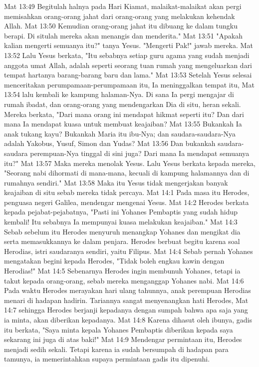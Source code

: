 Mat 13:49  Begitulah halnya pada Hari Kiamat, malaikat-malaikat akan pergi memisahkan orang-orang jahat dari orang-orang yang melakukan kehendak Allah.
Mat 13:50  Kemudian orang-orang jahat itu dibuang ke dalam tungku berapi. Di situlah mereka akan menangis dan menderita."
Mat 13:51  "Apakah kalian mengerti semuanya itu?" tanya Yesus. "Mengerti Pak!" jawab mereka.
Mat 13:52  Lalu Yesus berkata, "Itu sebabnya setiap guru agama yang sudah menjadi anggota umat Allah, adalah seperti seorang tuan rumah yang mengeluarkan dari tempat hartanya barang-barang baru dan lama."
Mat 13:53  Setelah Yesus selesai menceritakan perumpamaan-perumpamaan itu, Ia meninggalkan tempat itu,
Mat 13:54  lalu kembali ke kampung halaman-Nya. Di sana Ia pergi mengajar di rumah ibadat, dan orang-orang yang mendengarkan Dia di situ, heran sekali. Mereka berkata, "Dari mana orang ini mendapat hikmat seperti itu? Dan dari mana Ia mendapat kuasa untuk membuat keajaiban?
Mat 13:55  Bukankah Ia anak tukang kayu? Bukankah Maria itu ibu-Nya; dan saudara-saudara-Nya adalah Yakobus, Yusuf, Simon dan Yudas?
Mat 13:56  Dan bukankah saudara-saudara perempuan-Nya tinggal di sini juga? Dari mana Ia mendapat semuanya itu?"
Mat 13:57  Maka mereka menolak Yesus. Lalu Yesus berkata kepada mereka, "Seorang nabi dihormati di mana-mana, kecuali di kampung halamannya dan di rumahnya sendiri."
Mat 13:58  Maka itu Yesus tidak mengerjakan banyak keajaiban di situ sebab mereka tidak percaya.
Mat 14:1  Pada masa itu Herodes, penguasa negeri Galilea, mendengar mengenai Yesus.
Mat 14:2  Herodes berkata kepada pejabat-pejabatnya, "Pasti ini Yohanes Pembaptis yang sudah hidup kembali! Itu sebabnya Ia mempunyai kuasa melakukan keajaiban."
Mat 14:3  Sebab sebelum itu Herodes menyuruh menangkap Yohanes dan mengikat dia serta memasukkannya ke dalam penjara. Herodes berbuat begitu karena soal Herodias, istri saudaranya sendiri, yaitu Filipus.
Mat 14:4  Sebab pernah Yohanes mengatakan begini kepada Herodes, "Tidak boleh engkau kawin dengan Herodias!"
Mat 14:5  Sebenarnya Herodes ingin membunuh Yohanes, tetapi ia takut kepada orang-orang, sebab mereka menganggap Yohanes nabi.
Mat 14:6  Pada waktu Herodes merayakan hari ulang tahunnya, anak perempuan Herodias menari di hadapan hadirin. Tariannya sangat menyenangkan hati Herodes,
Mat 14:7  sehingga Herodes berjanji kepadanya dengan sumpah bahwa apa saja yang ia minta, akan diberikan kepadanya.
Mat 14:8  Karena dihasut oleh ibunya, gadis itu berkata, "Saya minta kepala Yohanes Pembaptis diberikan kepada saya sekarang ini juga di atas baki!"
Mat 14:9  Mendengar permintaan itu, Herodes menjadi sedih sekali. Tetapi karena ia sudah bersumpah di hadapan para tamunya, ia memerintahkan supaya permintaan gadis itu dipenuhi.
